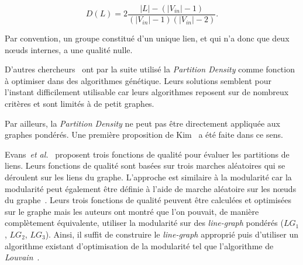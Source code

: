 \begin{equation}
 D(L) = 2 \dfrac{|L| - (|V_{in}|-1) }{(|V_{in}|-1) (|V_{in}|-2)}.
\end{equation}

Par convention, un groupe constitué d'un unique lien, et qui n'a donc que deux n\oe uds internes, a une qualité nulle.

D'autres chercheurs~\cite{Li2013,Shi2013} ont par la suite utilisé la \emph{Partition Density} comme fonction à optimiser dans des algorithmes génétique.
Leurs solutions semblent pour l'instant difficilement utilisable car leurs algorithmes reposent sur de nombreux critères et sont limités à de petit graphes.

Par ailleurs, la \emph{Partition Density} ne peut pas être directement appliquée aux graphes pondérés.
Une première proposition de Kim~\cite{Kim2014} a été faite dans ce sens.


Evans~\emph{et al.}~\cite{Evans2009} proposent trois fonctions de qualité pour évaluer les partitions de liens.
Leurs fonctions de qualité sont basées sur trois marches aléatoires qui se déroulent sur les liens du graphe.
L'approche est similaire à la modularité car la modularité peut également être définie à l'aide de marche aléatoire sur les n\oe uds du graphe~\cite{Delvenne2010}.
Leurs trois fonctions de qualité peuvent être calculées et optimisées sur le graphe mais les auteurs ont montré que l'on pouvait, de manière complètement équivalente, utiliser la modularité sur des \emph{line-graph} pondérés ($LG_1$, $LG_2$, $LG_3$).
Ainsi, il suffit de construire le \emph{line-graph} approprié puis d'utiliser un algorithme existant d'optimisation de la modularité tel que l'algorithme de \emph{Louvain}~\cite{Blondel2008a}.


